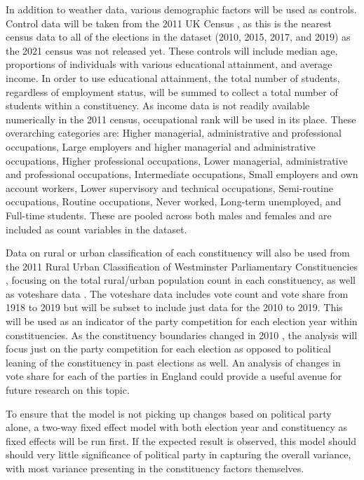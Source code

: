 \documentclass[12pt,letterpaper]{article}
\begin{document}
In addition to weather data, various demographic factors will be used as controls. Control data will be taken from the 2011 UK Census \autocite{2011CensusOffice}, as this is the nearest census data to all of the elections in the dataset (2010, 2015, 2017, and 2019) as the 2021 census was not released yet. These controls will include median age, proportions of individuals with various educational attainment, and average income. In order to use educational attainment, the total number of students, regardless of employment status, will be summed to collect a total number of students within a constituency. As income data is not readily available numerically in the 2011 census, occupational rank will be used in its place. These overarching categories are: Higher managerial, administrative and professional occupations, Large employers and higher managerial and administrative occupations, Higher professional occupations, Lower managerial, administrative and professional occupations, Intermediate occupations, Small employers and own account workers, Lower supervisory and technical occupations, Semi-routine occupations, Routine occupations, Never worked, Long-term unemployed, and Full-time students. These are pooled across both males and females and are included as count variables in the dataset.

Data on rural or urban classification of each constituency will also be used from the 2011 Rural Urban Classification of Westminster Parliamentary Constituencies \autocite{RuralUrbanClassification}, focusing on the total rural/urban population count in each constituency, as well as voteshare data \autocite{watsonGeneralElectionResults2024}. The voteshare data includes vote count and vote share from 1918 to 2019 but will be subset to include just data for the 2010 to 2019. This will be used as an indicator of the party competition for each election year within constituencies. As the constituency boundaries changed in 2010 \autocite{cracknell2010GeneralElection2024}, the analysis will focus just on the party competition for each election as opposed to political leaning of the constituency in past elections as well. An analysis of changes in vote share for each of the parties in England could provide a useful avenue for future research on this topic. 

To ensure that the model is not picking up changes based on political party alone, a two-way fixed effect model with both election year and constituency as fixed effects will be run first. If the expected result is observed, this model should should very little significance of political party in capturing the overall variance, with most variance presenting in the constituency factors themselves.
\end{document}
